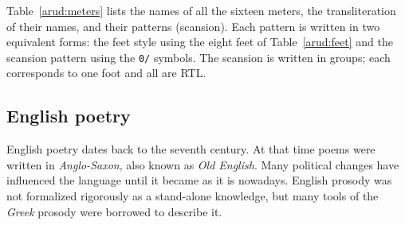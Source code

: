\documentclass[journal,10pt,twocolumns,letter]{IEEEtran}
\begin{document}
Table~\ref{arud:meters} lists the names of all the sixteen meters, the transliteration of their
names, and their patterns (scansion). Each pattern is written in two equivalent forms: the feet
style using the eight feet of Table~\ref{arud:feet} and the scansion pattern using the \texttt{0/}
symbols. The scansion is written in groups; each corresponds to one foot and all are RTL\@.


\subsection{English poetry}\label{sec:english-poetry}
English poetry dates back to the seventh century. At that time poems were written in
\textit{Anglo-Saxon}, also known as \textit{Old English}. Many political changes have influenced
the language until it became as it is nowadays. English prosody was not formalized rigorously as a
stand-alone knowledge, but many tools of the \textit{Greek} prosody were borrowed to describe it.
\end{document}
